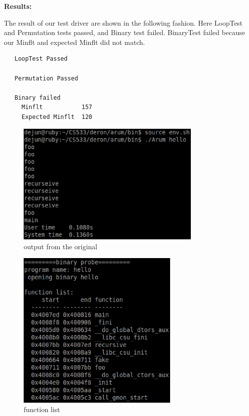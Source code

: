 \documentclass[11pt,letterpaper,oneside]{article}
\begin{document}
{\bf Results:}\newline

The result of our test driver are shown in the following fashion. Here LoopTest and Permutation tests passed, and Binary test failed. BinaryTest failed because our Minflt and expected Minflt did not match. 

\begin{verbatim}
   LoopTest Passed

   Permutation Passed

   Binary failed
     Minflt           157
     Expected Minflt  120
\end{verbatim}

\label{sec:results}
\begin{figure}
\begin{center}
\includegraphics[width=0.8\textwidth]{orig.eps}
\caption{output from the original}
\label{fig:orig}
\end{center}
\end{figure}
\begin{figure}
\begin{center}
\includegraphics[width=0.7\textwidth]{list.eps}
\caption{function list}
\label{fig:list}
\end{center}
\end{figure}
\end{document}
